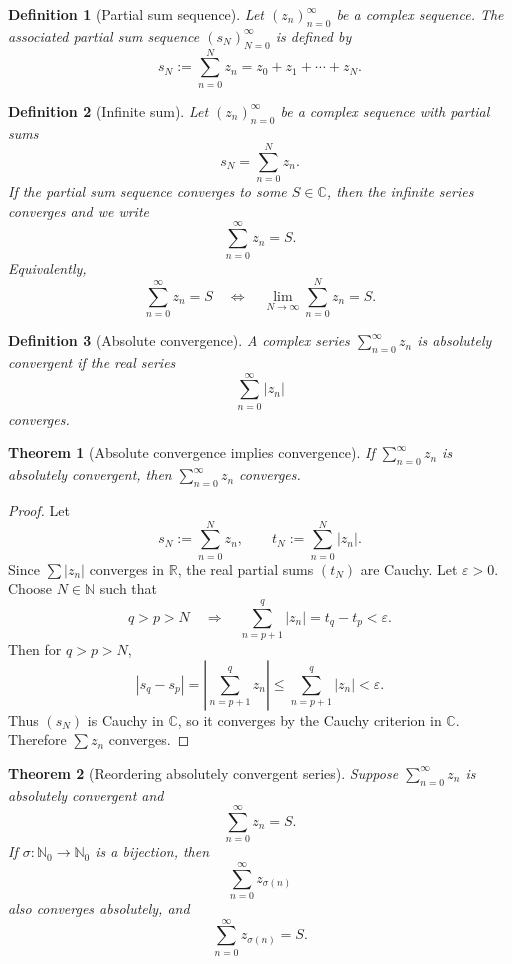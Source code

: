 \documentclass[11pt]{article}
\newtheorem{definition}{Definition}[section]
\newtheorem{theorem}{Theorem}[section]
\newcommand{\C}{\mathbb{C}}
\newcommand{\R}{\mathbb{R}}
\newcommand{\N}{\mathbb{N}}
\newcommand{\abs}[1]{\left|#1\right|}
\begin{document}
\begin{definition}[Partial sum sequence]
Let $(z_{n})_{n=0}^{\infty}$ be a complex sequence.
The associated partial sum sequence $(s_{N})_{N=0}^{\infty}$ is defined by
\[
  s_{N}:=\sum_{n=0}^{N} z_{n}
  =z_{0}+z_{1}+\cdots+z_{N}.
\]
\end{definition}

\begin{definition}[Infinite sum]
Let $(z_{n})_{n=0}^{\infty}$ be a complex sequence with partial sums
\[
  s_{N}=\sum_{n=0}^{N}z_{n}.
\]
If the partial sum sequence converges to some $S\in\C$, then the infinite series converges and we write
\[
  \sum_{n=0}^{\infty}z_{n}=S.
\]
Equivalently,
\[
  \sum_{n=0}^{\infty}z_{n}=S
  \quad\Longleftrightarrow\quad
  \lim_{N\to\infty}\sum_{n=0}^{N}z_{n}=S.
\]
\end{definition}

\begin{definition}[Absolute convergence]
A complex series $\sum_{n=0}^{\infty}z_{n}$ is absolutely convergent if the real series
\[
  \sum_{n=0}^{\infty}\abs{z_{n}}
\]
converges.
\end{definition}

\begin{theorem}[Absolute convergence implies convergence]
If $\sum_{n=0}^{\infty}z_{n}$ is absolutely convergent, then $\sum_{n=0}^{\infty}z_{n}$ converges.
\end{theorem}

\begin{proof}
Let
\[
  s_{N}:=\sum_{n=0}^{N}z_{n},
  \qquad
  t_{N}:=\sum_{n=0}^{N}\abs{z_{n}}.
\]
Since $\sum\abs{z_{n}}$ converges in $\R$, the real partial sums $(t_{N})$ are Cauchy.
Let $\varepsilon>0$.
Choose $N\in\N$ such that
\[
  q>p>N
  \quad\Longrightarrow\quad
  \sum_{n=p+1}^{q}\abs{z_{n}}
  =t_{q}-t_{p}<\varepsilon.
\]
Then for $q>p>N$,
\[
  \abs{s_{q}-s_{p}}
  =\abs{\sum_{n=p+1}^{q}z_{n}}
  \le \sum_{n=p+1}^{q}\abs{z_{n}}
  <\varepsilon.
\]
Thus $(s_{N})$ is Cauchy in $\C$, so it converges by the Cauchy criterion in $\C$.
Therefore $\sum z_{n}$ converges.
\end{proof}

\begin{theorem}[Reordering absolutely convergent series]
Suppose $\sum_{n=0}^{\infty}z_{n}$ is absolutely convergent and
\[
  \sum_{n=0}^{\infty}z_{n}=S.
\]
If $\sigma:\N_{0}\to\N_{0}$ is a bijection, then
\[
  \sum_{n=0}^{\infty}z_{\sigma(n)}
\]
also converges absolutely, and
\[
  \sum_{n=0}^{\infty}z_{\sigma(n)}=S.
\]
\end{theorem}
\end{document}
